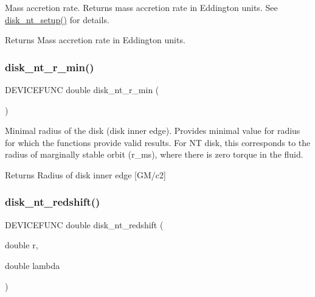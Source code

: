 Mass accretion rate. Returns mass accretion rate in Eddington units. See {\ttfamily \hyperlink{sim5disk-nt_8c_a0d21c45c6cae4ab611409f661d6031e4}{disk\+\_\+nt\+\_\+setup()}} for details.

\begin{DoxyReturn}{Returns}
Mass accretion rate in Eddington units. 
\end{DoxyReturn}
\mbox{\label{sim5disk-nt_8c_a8922cee7769517cf6984134ad8caa0b6}} 
\subsubsection{\texorpdfstring{disk\+\_\+nt\+\_\+r\+\_\+min()}{disk\_nt\_r\_min()}}
{\footnotesize\ttfamily D\+E\+V\+I\+C\+E\+F\+U\+NC double disk\+\_\+nt\+\_\+r\+\_\+min (\begin{DoxyParamCaption}{ }\end{DoxyParamCaption})}

Minimal radius of the disk (disk inner edge). Provides minimal value for radius for which the functions provide valid results. For NT disk, this corresponds to the radius of marginally stable orbit (r\+\_\+ms), where there is zero torque in the fluid.

\begin{DoxyReturn}{Returns}
Radius of disk inner edge \mbox{[}G\+M/c2\mbox{]} 
\end{DoxyReturn}
\mbox{\label{sim5disk-nt_8c_a2a1cdf30047160340c200afd110c0890}} 
\subsubsection{\texorpdfstring{disk\+\_\+nt\+\_\+redshift()}{disk\_nt\_redshift()}}
{\footnotesize\ttfamily D\+E\+V\+I\+C\+E\+F\+U\+NC double disk\+\_\+nt\+\_\+redshift (\begin{DoxyParamCaption}\item[{double}]{r,  }\item[{double}]{lambda }\end{DoxyParamCaption})}

